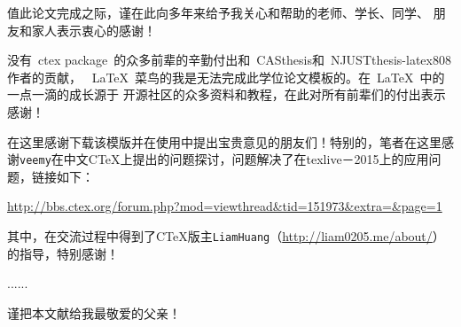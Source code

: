 \begin{thanks}

值此论文完成之际，谨在此向多年来给予我关心和帮助的老师、学长、同学、
朋友和家人表示衷心的感谢！

没有~ctex package~的众多前辈的辛勤付出和~CASthesis和~NJUSTthesis-latex808作者的贡献，
~\LaTeX{}~菜鸟的我是无法完成此学位论文模板的。在~\LaTeX{}~中的一点一滴的成长源于
开源社区的众多资料和教程，在此对所有前辈们的付出表示感谢！

在这里感谢下载该模版并在使用中提出宝贵意见的朋友们！特别的，笔者在这里感谢\texttt{veemy}在中文CTeX上提出的问题探讨，问题解决了在texlive－2015上的应用问题，链接如下：

\url{http://bbs.ctex.org/forum.php?mod=viewthread&tid=151973&extra=&page=1}

其中，在交流过程中得到了CTeX版主\texttt{LiamHuang}（\url{http://liam0205.me/about/}）的指导，特别感谢！

......

\vskip 18pt

谨把本文献给我最敬爱的父亲！

\end{thanks}